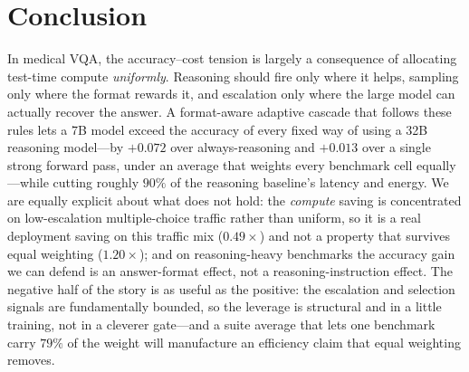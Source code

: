 \documentclass[conference]{IEEEtran}
\begin{document}
\section{Conclusion}
In medical VQA, the accuracy--cost tension is largely a consequence of allocating test-time compute \emph{uniformly}. Reasoning should fire only where it helps, sampling only where the format rewards it, and escalation only where the large model can actually recover the answer. A format-aware adaptive cascade that follows these rules lets a 7B model exceed the accuracy of every fixed way of using a 32B reasoning model---by $+0.072$ over always-reasoning and $+0.013$ over a single strong forward pass, under an average that weights every benchmark cell equally---while cutting roughly $90\%$ of the reasoning baseline's latency and energy. We are equally explicit about what does not hold: the \emph{compute} saving is concentrated on low-escalation multiple-choice traffic rather than uniform, so it is a real deployment saving on this traffic mix ($0.49{\times}$) and not a property that survives equal weighting ($1.20{\times}$); and on reasoning-heavy benchmarks the accuracy gain we can defend is an answer-format effect, not a reasoning-instruction effect. The negative half of the story is as useful as the positive: the escalation and selection signals are fundamentally bounded, so the leverage is structural and in a little training, not in a cleverer gate---and a suite average that lets one benchmark carry $79\%$ of the weight will manufacture an efficiency claim that equal weighting removes.
\end{document}
